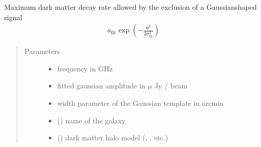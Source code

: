 \documentclass[letterpaper,10pt,english]{sphinxmanual}
\begin{document}
\begin{fulllineitems}
\label{\detokenize{diffsph:diffsph.limits.decay_rate_gausslim}}
\sphinxAtStartPar
Maximum dark matter decay rate allowed by the exclusion of a Gaussian\sphinxhyphen{}shaped signal
\begin{equation*}
\begin{split}a_\text{fit}\exp\left(-\frac{\theta^2}{2\sigma_\text{fit}^2}\right)\end{split}
\end{equation*}\begin{quote}\begin{description}
\item[{Parameters}] \leavevmode\begin{itemize}
\item {} 
\sphinxAtStartPar
{} \textendash{} frequency in GHz

\item {} 
\sphinxAtStartPar
{} \textendash{} fitted gaussian amplitude in \(\mu\) Jy / beam

\item {} 
\sphinxAtStartPar
{} \textendash{} width parameter of the Gaussian template in arcmin

\item {} 
\sphinxAtStartPar
{} () \textendash{} name of the galaxy

\item {} 
\sphinxAtStartPar
{} () \textendash{} dark matter halo model (, , etc.)


\end{itemize}
\end{description}
\end{quote}
\end{fulllineitems}
\end{document}
